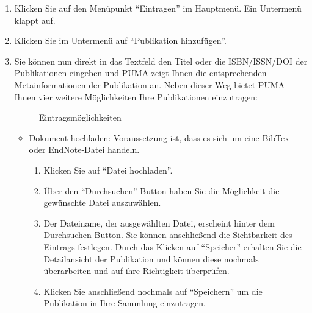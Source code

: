 \begin{enumerate}
    \item Klicken Sie auf den Menüpunkt \enquote{Eintragen} im Hauptmenü. Ein Untermenü klappt auf.
    \item Klicken Sie im Untermenü auf \enquote{Publikation hinzufügen}.
    \item Sie können nun direkt in das Textfeld den Titel oder die ISBN/ISSN/DOI der Publikationen eingeben und PUMA zeigt Ihnen die entsprechenden Metainformationen der Publikation an. Neben dieser Weg bietet PUMA Ihnen vier weitere Möglichkeiten Ihre Publikationen einzutragen:
\begin{figure}[h!]
 \centering
 \caption{Eintragsmöglichkeiten}
 \label{figure3}
\end{figure}  
    \begin{itemize}
    	\item Dokument hochladen:\newline
        Voraussetzung ist, dass es sich um eine BibTex- oder EndNote-Datei handeln.
        \begin{enumerate}
            \item Klicken Sie auf \enquote{Datei hochladen}.
            \item Über den \enquote{Durchsuchen} Button haben Sie die Möglichkeit die gewünschte Datei auszuwählen.
            \item Der Dateiname, der ausgewählten Datei, erscheint hinter dem Durchsuchen-Button. Sie können anschließend die Sichtbarkeit des Eintrags festlegen. Durch das Klicken auf \enquote{Speicher} erhalten Sie die Detailansicht der Publikation und können diese nochmals überarbeiten und auf ihre Richtigkeit überprüfen.
            \item Klicken Sie anschließend nochmals auf \enquote{Speichern} um die Publikation in Ihre Sammlung einzutragen.
        \end{enumerate}

\end{itemize}
\end{enumerate}
